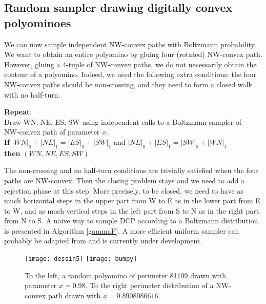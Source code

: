 \documentclass{article}
\begin{document}
\subsection{Random sampler drawing digitally convex polyominoes}
We can now sample independent NW-convex paths with Boltzmann probability.
We want to obtain an entire polyomino by gluing four (rotated) NW-convex path. \\
However, gluing a 4-tuple of NW-convex paths, we do not necessarily obtain the contour of a polyomino.
 Indeed, we need the following extra conditions: the four NW-convex paths should be non-crossing, and they need to form a closed walk with no half-turn. \\


\begin{algorithm}[!h]
\caption{$\Gamma_{P} $}
\label{gammaP}
\textbf{Repeat}:\\
\hspace{0.6cm}Draw WN, NE, ES, SW using independent calls to a Boltzmann sampler of\\
\hspace{0.6cm}NW-convex path of parameter $x$.\\
\hspace{0.6cm}\textbf{If} $|WN|_0 + |NE|_1=|ES|_0+|SW|_1$ and $|NE|_0+|ES|_1=|SW|_0+|WN|_1$ \\
\hspace{.6cm}\textbf{then} \Return $(WN, NE, ES, SW)$\\
\end{algorithm}

The non-crossing and no half-turn conditions are trivially satisfied when the four paths are NW-convex. Then the closing problem stays and we need to add a rejection phase at this step.
More precisely, to be closed, we need to have as much horizontal steps in the upper part from W to E as
 in the lower part from E to W, and as much vertical steps in the left part from S to N as in the right part from N to S. 
 A naive way to sample DCP according to a Boltzmann distribution is presented in Algorithm \ref{gammaP}. A more efficient uniform sampler can probably be adapted from \cite{BoGaRo10} and is currently under development. 




\begin{figure}[!h]

\hspace{-0.45cm}
\texttt{[image: dessin5]}
\texttt{[image: bumpy]}
\hspace{-0.35cm}
\caption{To the left, a random polyomino of perimeter 81109 drawn with parameter $x=0.98$. 
To the right perimeter distribution of a NW-convex path drawn with $x=0.8908086616$.}
\label{grosdessin}
\end{figure}
\end{document}
